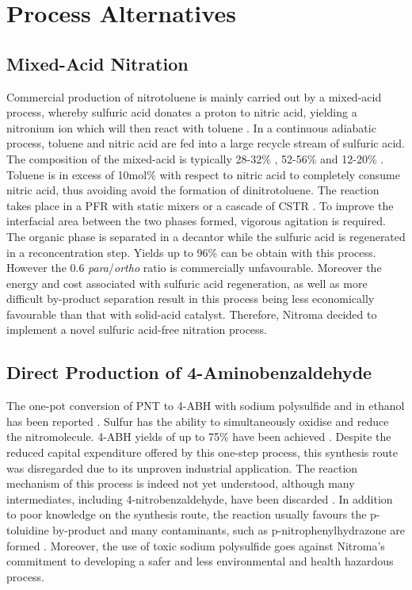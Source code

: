 \section{Process Alternatives}
\label{app:alternatives}

\subsection{Mixed-Acid Nitration}
Commercial production of nitrotoluene is mainly carried out by a mixed-acid process, whereby sulfuric acid donates a proton to nitric acid, yielding a nitronium ion which will then react with toluene \cite{halder_nitration_2007}. In a continuous adiabatic process, toluene and nitric acid are fed into a large recycle stream of sulfuric acid. The composition of the mixed-acid is typically 28-32\% , 52-56\%  and 12-20\%  \cite{dugal_nitrobenzene_2005}. Toluene is in excess of 10mol\% with respect to nitric acid to completely consume nitric acid, thus avoiding avoid the formation of dinitrotoluene. The reaction takes place in a PFR with static mixers or a cascade of CSTR \cite{dugal_nitrobenzene_2005}. To improve the interfacial area between the two phases formed, vigorous agitation is required. The organic phase is separated in a decantor while the sulfuric acid is regenerated in a reconcentration step. Yields up to 96\% can be obtain with this process. However the 0.6 \textit{para}/\textit{ortho} ratio is commercially unfavourable. Moreover the energy and cost associated with sulfuric acid regeneration, as well as more difficult by-product separation result in this process being less economically favourable than that with solid-acid catalyst. Therefore, Nitroma decided to implement a novel sulfuric acid-free nitration process.



\subsection{Direct Production of 4-Aminobenzaldehyde}
The one-pot conversion of PNT to 4-ABH with sodium polysulfide and  in ethanol has been reported \cite{ogata_mechanism_1979}. Sulfur has the ability to simultaneously oxidise and reduce the nitromolecule. 4-ABH yields of up to 75\% have been achieved \cite{beard_preparation_1944}. Despite the reduced capital expenditure offered by this one-step process, this synthesis route was disregarded due to its unproven industrial application. The reaction mechanism of this process is indeed not yet understood, although many intermediates, including 4-nitrobenzaldehyde, have been discarded \cite{ogata_mechanism_1979}. In addition to poor knowledge on the synthesis route, the reaction usually favours the p-toluidine by-product and many contaminants, such as p-nitrophenylhydrazone are formed \cite{beard_preparation_1944}. Moreover, the use of toxic sodium polysulfide goes against Nitroma's commitment to developing a safer and less environmental and health hazardous process.


